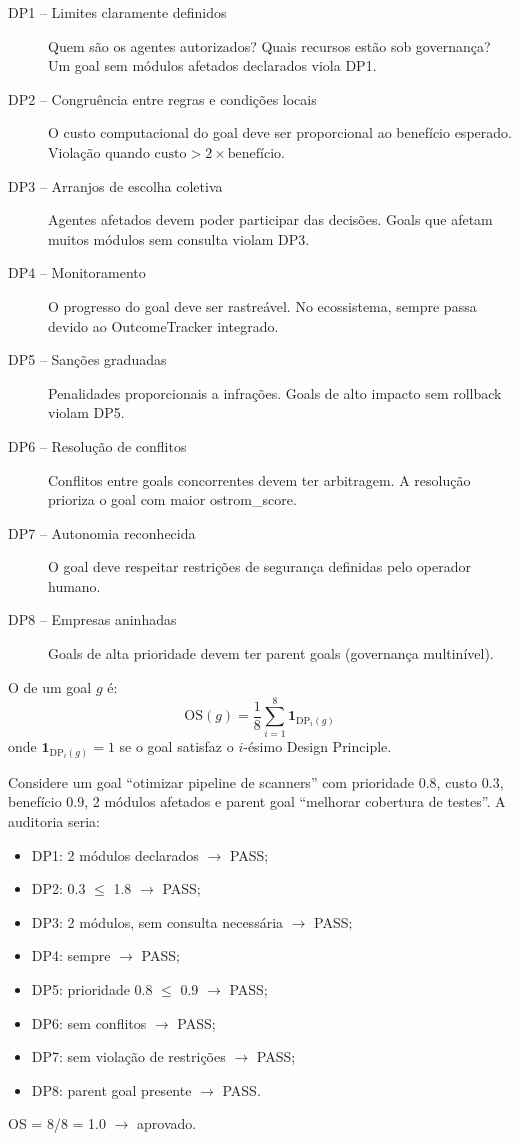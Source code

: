 \begin{description}
\item[DP1 -- Limites claramente definidos] Quem são os agentes
autorizados? Quais recursos estão sob governança? Um goal sem módulos
afetados declarados viola DP1.
\item[DP2 -- Congruência entre regras e condições locais] O custo
computacional do goal deve ser proporcional ao benefício esperado.
Violação quando $\text{custo} > 2 \times \text{benefício}$.
\item[DP3 -- Arranjos de escolha coletiva] Agentes afetados devem
poder participar das decisões. Goals que afetam muitos módulos sem
consulta violam DP3.
\item[DP4 -- Monitoramento] O progresso do goal deve ser rastreável.
No ecossistema, sempre passa devido ao OutcomeTracker integrado.
\item[DP5 -- Sanções graduadas] Penalidades proporcionais a infrações.
Goals de alto impacto sem rollback violam DP5.
\item[DP6 -- Resolução de conflitos] Conflitos entre goals
concorrentes devem ter arbitragem. A resolução prioriza o goal com
maior ostrom\_score.
\item[DP7 -- Autonomia reconhecida] O goal deve respeitar restrições
de segurança definidas pelo operador humano.
\item[DP8 -- Empresas aninhadas] Goals de alta prioridade devem ter
parent goals (governança multinível).
\end{description}

\begin{definicao}
O  de um goal $g$ é:
\[
\text{OS}(g) = \frac{1}{8} \sum_{i=1}^{8} \mathbf{1}_{\text{DP}_i(g)}
\]
onde $\mathbf{1}_{\text{DP}_i(g)} = 1$ se o goal satisfaz o
$i$-ésimo Design Principle.
\end{definicao}

\begin{exemplo}
Considere um goal ``otimizar pipeline de scanners'' com prioridade
0.8, custo 0.3, benefício 0.9, 2 módulos afetados e parent goal
``melhorar cobertura de testes''. A auditoria seria:
\begin{itemize}
\item DP1: 2 módulos declarados $\to$ PASS;
\item DP2: 0.3 $\leq$ 1.8 $\to$ PASS;
\item DP3: 2 módulos, sem consulta necessária $\to$ PASS;
\item DP4: sempre $\to$ PASS;
\item DP5: prioridade 0.8 $\leq$ 0.9 $\to$ PASS;
\item DP6: sem conflitos $\to$ PASS;
\item DP7: sem violação de restrições $\to$ PASS;
\item DP8: parent goal presente $\to$ PASS.
\end{itemize}
OS = 8/8 = 1.0 $\to$ aprovado.
\end{exemplo}

